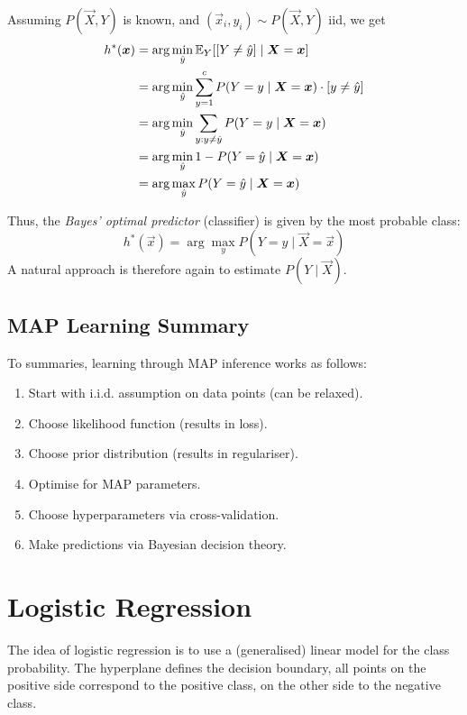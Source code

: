 Assuming $P(\vec{X}, Y)$ is known,
and $(\vec{x}_i, y_i) \sim P(\vec{X}, Y)$ iid,
we get
\begin{align*}
h^*(\boldsymbol{x}) &= \arg\min_{\hat{y}}{
	\mathbb{E}_Y[[Y \neq \hat{y}] \mid \boldsymbol{X} = \boldsymbol{x}]
} \\
&= \arg\min_{\hat{y}}{
	\sum_{y=1}^c{P(Y = y \mid \boldsymbol{X} = \boldsymbol{x}) \cdot [y \neq \hat{y}] }
} \\
&= \arg\min_{\hat{y}}{
	\sum_{y : y \neq \hat{y}}{P(Y = y \mid \boldsymbol{X} = \boldsymbol{x})}    
} \\
&= \arg\min_{\hat{y}}{1 - P(Y = \hat{y} \mid \boldsymbol{X} = \boldsymbol{x})} \\
&= \arg\max_{\hat{y}}{P(Y = \hat{y} \mid \boldsymbol{X} = \boldsymbol{x})}
\end{align*}

Thus, the \emph{Bayes' optimal predictor} (classifier)
is given by the most probable class:
\begin{equation*}
h^*(\vec{x}) = \arg\max_y{P(Y = y \mid \vec{X} = \vec{x})}
\end{equation*}
A natural approach is therefore again to estimate $P(Y \mid \vec{X})$.


\subsection{MAP Learning Summary}
To summaries, learning through MAP inference
works as follows:
\begin{enumerate}
	\item Start with i.i.d. assumption
	on data points (can be relaxed).
	\item Choose likelihood function
	(results in loss).
	\item Choose prior distribution
	(results in regulariser).
	\item Optimise for MAP parameters.
	\item Choose hyperparameters
	via cross-validation.
	\item Make predictions via Bayesian
	decision theory.
\end{enumerate}


\section{Logistic Regression}
The idea of logistic regression is to use a
(generalised) linear model for the class
probability.
The hyperplane defines the decision boundary,
all points on the positive side correspond
to the positive class, on the other side
to the negative class.

